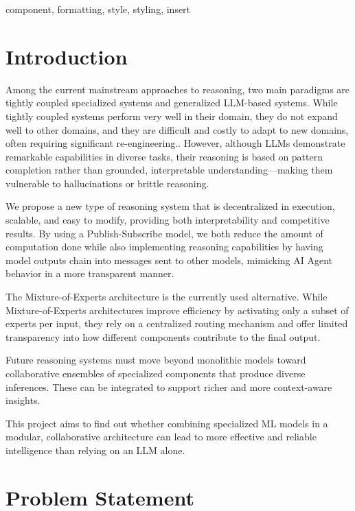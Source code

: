 \documentclass[conference]{IEEEtran}
\begin{document}
\begin{IEEEkeywords}
component, formatting, style, styling, insert
\end{IEEEkeywords}

\section{Introduction}
Among the current mainstream approaches to reasoning, two main paradigms are tightly coupled specialized systems and generalized LLM-based systems. While tightly coupled systems perform very well in their domain, they do not expand well to other domains, and they are difficult and costly to adapt to new domains, often requiring significant re-engineering.. However, although LLMs demonstrate remarkable capabilities in diverse tasks, their reasoning is based on pattern completion rather than grounded, interpretable understanding—making them vulnerable to hallucinations or brittle reasoning.

We propose a new type of reasoning system that is decentralized in execution, scalable, and easy to modify, providing both interpretability and competitive results. By using a Publish-Subscribe model, we both reduce the amount of computation done while also implementing reasoning capabilities by having model outputs chain into messages sent to other models, mimicking AI Agent behavior in a more transparent manner.

The Mixture-of-Experts architecture is the currently used alternative. While Mixture-of-Experts architectures improve efficiency by activating only a subset of experts per input, they rely on a centralized routing mechanism and offer limited transparency into how different components contribute to the final output.

Future reasoning systems must move beyond monolithic models toward collaborative ensembles of specialized components that produce diverse inferences. These can be integrated to support richer and more context-aware insights.

This project aims to find out whether combining specialized ML models in a modular, collaborative architecture can lead to more effective and reliable intelligence than relying on an LLM alone.



\section{Problem Statement}
\end{document}
